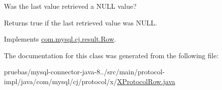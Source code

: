 Was the last value retrieved a N\+U\+LL value?

\begin{DoxyReturn}{Returns}
true if the last retrieved value was N\+U\+LL. 
\end{DoxyReturn}


Implements \mbox{\hyperlink{interfacecom_1_1mysql_1_1cj_1_1result_1_1_row_a6a915f3dfaf8f9997f705b7762f9c6cb}{com.\+mysql.\+cj.\+result.\+Row}}.



The documentation for this class was generated from the following file\+:\begin{DoxyCompactItemize}
\item 
pruebas/mysql-\/connector-\/java-\/8../src/main/protocol-\/impl/java/com/mysql/cj/protocol/x/\mbox{\hyperlink{_x_protocol_row_8java}{X\+Protocol\+Row.\+java}}\end{DoxyCompactItemize}
